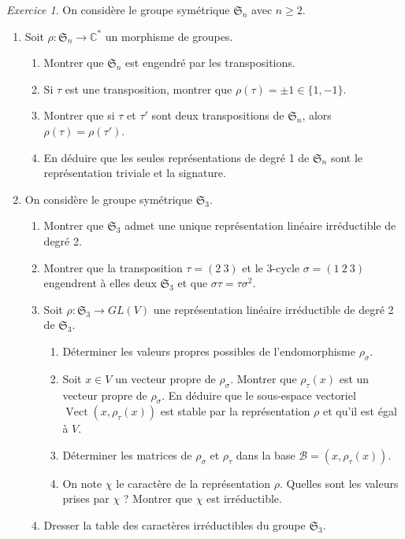 \documentclass[french]{book}
\theoremstyle{definition}
\theoremstyle{remark}
\newtheorem{exo}{Exercice}
\begin{document}
\begin{exo}
  On considère le groupe symétrique \(\mathfrak{S}_n\) avec \(n \geq 2\).

  \begin{enumerate}
    \item Soit \(\rho : \mathfrak{S}_n \longrightarrow \mathbb{C}^{*}\) un morphisme de groupes.
    \begin{enumerate}
      \item Montrer que \(\mathfrak{S}_n\) est engendré par les transpositions.
      \item Si \(\tau\) est une transposition, montrer que \(\rho(\tau) = \pm 1 \in \{1, -1\}\).
      \item Montrer que si \(\tau\) et \(\tau'\) sont deux transpositions de \(\mathfrak{S}_n\), alors \(\rho(\tau) = \rho(\tau')\).
      \item En déduire que les seules représentations de degré 1 de \(\mathfrak{S}_n\) sont le représentation triviale et la signature.
    \end{enumerate}

    \item On considère le groupe symétrique \(\mathfrak{S}_{3}\).
    \begin{enumerate}
      \item Montrer que \(\mathfrak{S}_{3}\) admet une unique représentation linéaire irréductible de degré 2.
      \item Montrer que la transposition \(\tau = (2 \ 3)\) et le 3-cycle \(\sigma = (1 \ 2 \ 3)\) engendrent à elles deux \(\mathfrak{S}_{3}\) et que \(\sigma \tau = \tau \sigma^2\).
      \item Soit \(\rho : \mathfrak{S}_{3} \longrightarrow GL(V)\) une représentation linéaire irréductible de degré 2 de \(\mathfrak{S}_{3}\).
      \begin{enumerate}
        \item Déterminer les valeurs propres possibles de l'endomorphisme \(\rho _{\sigma}\).
        \item Soit \(x \in V\) un vecteur propre de \(\rho _{\sigma}\). Montrer que \(\rho _{\tau}(x)\) est un vecteur propre de \(\rho _{\sigma}\). En déduire que le sous-espace vectoriel \(\operatorname{Vect}(x, \rho _{\tau}(x))\) est stable par la représentation \(\rho\) et qu'il est égal à \(V\).
        \item Déterminer les matrices de \(\rho _{\sigma}\) et \(\rho _{\tau}\) dans la base \(\mathcal{B} = (x, \rho _{\tau}(x))\).
        \item On note \(\chi\) le caractère de la représentation \(\rho\). Quelles sont les valeurs prises par \(\chi\) ? Montrer que \(\chi\) est irréductible.
      \end{enumerate}
      \item Dresser la table des caractères irréductibles du groupe \(\mathfrak{S}_{3}\).
    \end{enumerate}
  \end{enumerate}
\end{exo}
\end{document}
